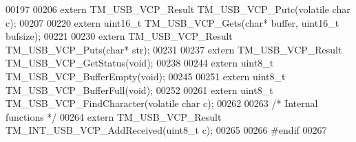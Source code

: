 \begin{DoxyCode}
00197 
00206 \textcolor{keyword}{extern} TM\_USB\_VCP\_Result TM\_USB\_VCP\_Putc(\textcolor{keyword}{volatile} \textcolor{keywordtype}{char} c);
00207 
00220 \textcolor{keyword}{extern} uint16\_t TM\_USB\_VCP\_Gets(\textcolor{keywordtype}{char}* buffer, uint16\_t bufsize);
00221 
00230 \textcolor{keyword}{extern} TM\_USB\_VCP\_Result TM\_USB\_VCP\_Puts(\textcolor{keywordtype}{char}* str);
00231 
00237 \textcolor{keyword}{extern} TM\_USB\_VCP\_Result TM\_USB\_VCP\_GetStatus(\textcolor{keywordtype}{void});
00238 
00244 \textcolor{keyword}{extern} uint8\_t TM\_USB\_VCP\_BufferEmpty(\textcolor{keywordtype}{void});
00245 
00251 \textcolor{keyword}{extern} uint8\_t TM\_USB\_VCP\_BufferFull(\textcolor{keywordtype}{void});
00252 
00261 \textcolor{keyword}{extern} uint8\_t TM\_USB\_VCP\_FindCharacter(\textcolor{keyword}{volatile} \textcolor{keywordtype}{char} c);
00262 
00263 \textcolor{comment}{/* Internal functions */}
00264 \textcolor{keyword}{extern} TM\_USB\_VCP\_Result TM\_INT\_USB\_VCP\_AddReceived(uint8\_t c);
00265 
00266 \textcolor{preprocessor}{#endif}
00267 
\end{DoxyCode}
